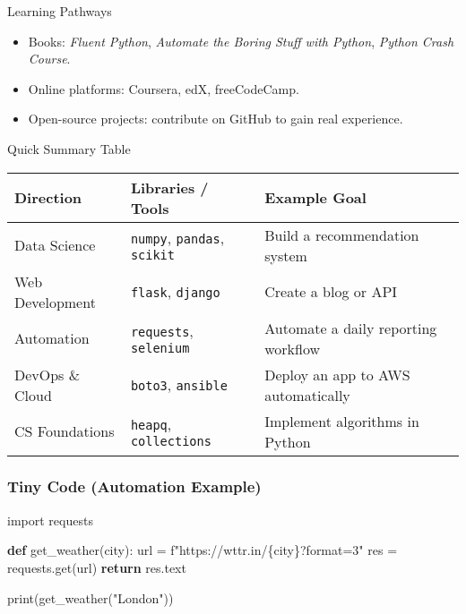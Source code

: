\documentclass[
  letterpaper,
  DIV=11,
  numbers=noendperiod]{scrreprt}
\newenvironment{Shaded}{\begin{snugshade}}{\end{snugshade}}
\newcommand{\BuiltInTok}[1]{\textcolor[rgb]{0.00,0.23,0.31}{#1}}
\newcommand{\ControlFlowTok}[1]{\textcolor[rgb]{0.00,0.23,0.31}{\textbf{#1}}}
\newcommand{\ImportTok}[1]{\textcolor[rgb]{0.00,0.46,0.62}{#1}}
\newcommand{\KeywordTok}[1]{\textcolor[rgb]{0.00,0.23,0.31}{\textbf{#1}}}
\newcommand{\NormalTok}[1]{\textcolor[rgb]{0.00,0.23,0.31}{#1}}
\newcommand{\OperatorTok}[1]{\textcolor[rgb]{0.37,0.37,0.37}{#1}}
\newcommand{\SpecialCharTok}[1]{\textcolor[rgb]{0.37,0.37,0.37}{#1}}
\newcommand{\SpecialStringTok}[1]{\textcolor[rgb]{0.13,0.47,0.30}{#1}}
\newcommand{\StringTok}[1]{\textcolor[rgb]{0.13,0.47,0.30}{#1}}
\providecommand{\tightlist}{%
  \setlength{\itemsep}{0pt}\setlength{\parskip}{0pt}}
\begin{document}
Learning Pathways

\begin{itemize}
\tightlist
\item
  Books: \emph{Fluent Python}, \emph{Automate the Boring Stuff with
  Python}, \emph{Python Crash Course}.
\item
  Online platforms: Coursera, edX, freeCodeCamp.
\item
  Open-source projects: contribute on GitHub to gain real experience.
\end{itemize}

Quick Summary Table

\begin{longtable}[]{@{}
  >{\raggedright\arraybackslash}p{}
  >{\raggedright\arraybackslash}p{}
  >{\raggedright\arraybackslash}p{}@{}}
\toprule\noalign{}
\begin{minipage}[b]{\linewidth}\raggedright
Direction
\end{minipage} & \begin{minipage}[b]{\linewidth}\raggedright
Libraries / Tools
\end{minipage} & \begin{minipage}[b]{\linewidth}\raggedright
Example Goal
\end{minipage} \\
\midrule\noalign{}
\endhead
\bottomrule\noalign{}
\endlastfoot
Data Science & \texttt{numpy}, \texttt{pandas}, \texttt{scikit} & Build
a recommendation system \\
Web Development & \texttt{flask}, \texttt{django} & Create a blog or
API \\
Automation & \texttt{requests}, \texttt{selenium} & Automate a daily
reporting workflow \\
DevOps \& Cloud & \texttt{boto3}, \texttt{ansible} & Deploy an app to
AWS automatically \\
CS Foundations & \texttt{heapq}, \texttt{collections} & Implement
algorithms in Python \\
\end{longtable}

\subsubsection{Tiny Code (Automation
Example)}\label{tiny-code-automation-example}

\begin{Shaded}
\begin{Highlighting}[]
\ImportTok{import}\NormalTok{ requests}

\KeywordTok{def}\NormalTok{ get\_weather(city):}
\NormalTok{    url }\OperatorTok{=} \SpecialStringTok{f"https://wttr.in/}\SpecialCharTok{\{}\NormalTok{city}\SpecialCharTok{\}}\SpecialStringTok{?format=3"}
\NormalTok{    res }\OperatorTok{=}\NormalTok{ requests.get(url)}
    \ControlFlowTok{return}\NormalTok{ res.text}

\BuiltInTok{print}\NormalTok{(get\_weather(}\StringTok{"London"}\NormalTok{))}
\end{Highlighting}
\end{Shaded}
\end{document}
